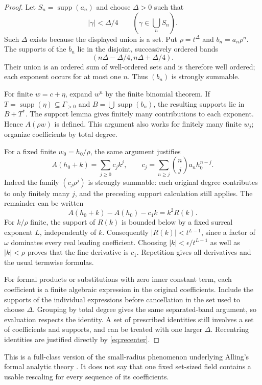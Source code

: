 \documentclass[11pt,letterpaper]{article}
\theoremstyle{definition}
\theoremstyle{remark}
\newcommand{\supp}{\operatorname{supp}}
\numberwithin{equation}{section}
\begin{document}
\begin{proof}
Let $S_n=\supp(a_n)$ and choose $\Delta>0$ such that
\[
 |\gamma|<\Delta/4\qquad(\gamma\in\bigcup_n S_n).
\]
Such $\Delta$ exists because the displayed union is a set. Put $\rho=t^\Delta$ and $b_n=a_n\rho^n$. The supports of the $b_n$ lie in the disjoint, successively ordered bands
\[
 (n\Delta-\Delta/4,n\Delta+\Delta/4).
\]
Their union is an ordered sum of well-ordered sets and is therefore well ordered; each exponent occurs for at most one $n$. Thus $(b_n)$ is strongly summable.

For finite $w=c+\eta$, expand $w^n$ by the finite binomial theorem. If $T=\supp(\eta)\subseteq\Gamma_{>0}$ and $B=\bigcup\supp(b_n)$, the resulting supports lie in $B+T^*$. The support lemma gives finitely many contributions to each exponent. Hence $A(\rho w)$ is defined. This argument also works for finitely many finite $w_j$; organize coefficients by total degree.

For a fixed finite $w_0=h_0/\rho$, the same argument justifies
\begin{equation}\label{eq:recenter}
 A(h_0+k)=\sum_{j\ge0}c_jk^j,
 \qquad c_j=\sum_{n\ge j}\binom nj a_nh_0^{n-j}.
\end{equation}
Indeed the family $(c_j\rho^j)$ is strongly summable: each original degree contributes to only finitely many $j$, and the preceding support calculation still applies. The remainder can be written
\[
 A(h_0+k)-A(h_0)-c_1k=k^2R(k).
\]
For $k/\rho$ finite, the support of $R(k)$ is bounded below by a fixed surreal exponent $L$, independently of $k$. Consequently $|R(k)|<t^{L-1}$, since a factor of $\omega$ dominates every real leading coefficient. Choosing $|k|<\epsilon/t^{L-1}$ as well as $|k|<\rho$ proves that the fine derivative is $c_1$. Repetition gives all derivatives and the usual termwise formulas.

For formal products or substitutions with zero inner constant term, each coefficient is a finite algebraic expression in the original coefficients. Include the supports of the individual expressions before cancellation in the set used to choose $\Delta$. Grouping by total degree gives the same separated-band argument, so evaluation respects the identity. A set of prescribed identities still involves a set of coefficients and supports, and can be treated with one larger $\Delta$. Recentring identities are justified directly by \eqref{eq:recenter}.
\end{proof}
This is a full-class version of the small-radius phenomenon underlying Alling's formal analytic theory \cite{Alling}. It does not say that one fixed set-sized field contains a usable rescaling for every sequence of its coefficients.
\end{document}
